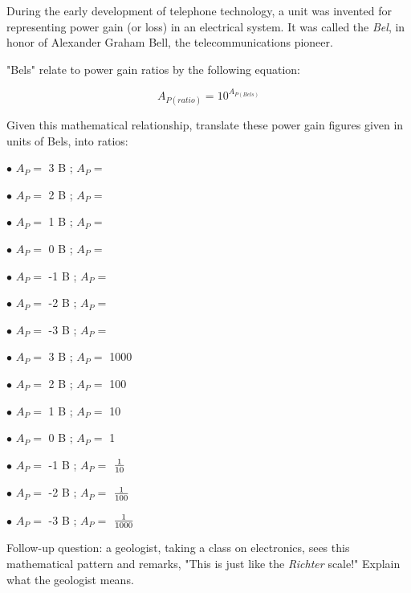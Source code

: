 

During the early development of telephone technology, a unit was invented for representing power gain (or loss) in an electrical system.  It was called the {\it Bel}, in honor of Alexander Graham Bell, the telecommunications pioneer.

"Bels" relate to power gain ratios by the following equation:

$$A_{P(ratio)} = 10^{A_{P(Bels)}}$$

Given this mathematical relationship, translate these power gain figures given in units of Bels, into ratios:

\medskip
\item{$\bullet$} $A_P =$ 3 B ; $A_P =$
\vskip 5pt
\item{$\bullet$} $A_P =$ 2 B ; $A_P =$
\vskip 5pt
\item{$\bullet$} $A_P =$ 1 B ; $A_P =$
\vskip 5pt
\item{$\bullet$} $A_P =$ 0 B ; $A_P =$
\vskip 5pt
\item{$\bullet$} $A_P =$ -1 B ; $A_P =$
\vskip 5pt
\item{$\bullet$} $A_P =$ -2 B ; $A_P =$
\vskip 5pt
\item{$\bullet$} $A_P =$ -3 B ; $A_P =$
\medskip







\medskip
\item{$\bullet$} $A_P =$ 3 B ; $A_P =$ 1000
\vskip 5pt
\item{$\bullet$} $A_P =$ 2 B ; $A_P =$ 100
\vskip 5pt
\item{$\bullet$} $A_P =$ 1 B ; $A_P =$ 10
\vskip 5pt
\item{$\bullet$} $A_P =$ 0 B ; $A_P =$ 1
\vskip 5pt
\item{$\bullet$} $A_P =$ -1 B ; $A_P =$ $1 \over 10$
\vskip 5pt
\item{$\bullet$} $A_P =$ -2 B ; $A_P =$ $1 \over 100$
\vskip 5pt
\item{$\bullet$} $A_P =$ -3 B ; $A_P =$ $1 \over 1000$
\medskip

\vskip 10pt

Follow-up question: a geologist, taking a class on electronics, sees this mathematical pattern and remarks, "This is just like the {\it Richter} scale!"  Explain what the geologist means.

